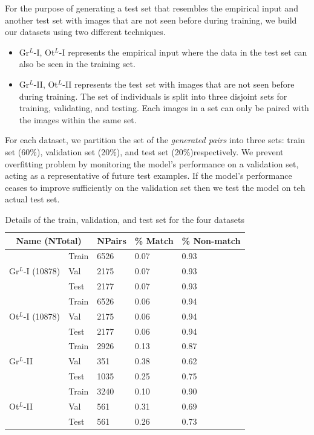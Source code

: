 For the purpose of generating a test set that resembles the empirical input and
another test set with images that are not seen before during training, we build
our datasets using two different techniques.
\begin{itemize}
  \item Gr$^{L}$-I, Ot$^{L}$-I represents the empirical input where the data in
  the test set can also be seen in the training set.
  \item Gr$^{L}$-II, Ot$^{L}$-II represents the test set with images that are
  not seen before during training. The set of individuals is split into three
  disjoint sets for training, validating, and testing. Each images in a set can
  only be paired with the images within the same set.
\end{itemize}

For each dataset, we partition the set of the \emph{generated pairs} into three
sets: train set (60\%), validation set (20\%), and test set (20\%)respectively.
We prevent overfitting problem by monitoring the model’s performance on a
validation set, acting as a representative of future test examples. If the
model’s performance ceases to improve sufficiently on the validation set then
we test the model on teh actual test set.


\begin{table}[t]
\captionsetup{justification=centering}
  \caption{Details of the train, validation, and test set for the four datasets}
\centering
  \begin{tabular}{lllll}
    \toprule
    \multicolumn{2}{c}{Name (NTotal)}      & NPairs & \% Match & \% Non-match \\
    \midrule
    \multirow{3}{*}{Gr$^{L}$-I (10878)}  & Train & 6526 & 0.07 & 0.93 \\
\cmidrule{2-5}
                                 & Val   & 2175 & 0.07 & 0.93 \\
\cmidrule{2-5}
                          & Test  & 2177 & 0.07 & 0.93 \\
\hline
\multirow{3}{*}{Ot$^{L}$-I (10878)}  & Train & 6526 & 0.06 & 0.94 \\
\cmidrule{2-5}
                                 & Val   & 2175 & 0.06 & 0.94 \\
\cmidrule{2-5}
                                 & Test  & 2177 & 0.06 & 0.94 \\
\hline
  \multirow{3}{*}{Gr$^{L}$-II} & Train & 2926 & 0.13 & 0.87\\
\cmidrule{2-5}
                                 & Val   & 351 & 0.38 & 0.62\\
\cmidrule{2-5}
                                 & Test  & 1035 & 0.25 & 0.75\\
    \hline
    \multirow{3}{*}{Ot$^{L}$-II} & Train & 3240 & 0.10 & 0.90\\
\cmidrule{2-5}
                                 & Val   & 561 & 0.31 & 0.69\\
\cmidrule{2-5}
                                 & Test  & 561& 0.26 & 0.73\\
    \bottomrule
  \end{tabular}
\end{table}
